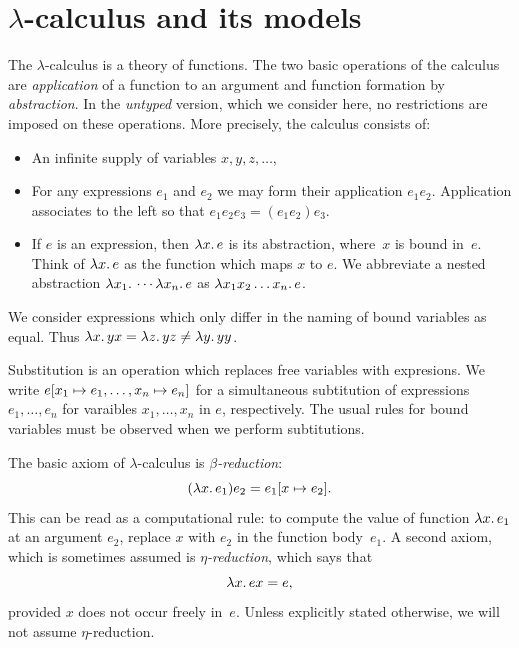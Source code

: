 \section{$\lambda$-calculus and its models}
\label{sec:lambda-calculus}

The $\lambda$-calculus is a theory of functions. The two basic
operations of the calculus are \emph{application} of a function to an
argument and function formation by \emph{abstraction}. In the
\emph{untyped} version, which we consider here, no restrictions are
imposed on these operations. More precisely, the calculus consists of:
%
\begin{itemize}
\item An infinite supply of variables $x, y, z, \ldots$,
\item For any expressions $e_1$ and $e_2$ we may form their
  application $e_1 e_2$. Application associates to the left so that
  $e_1 e_2 e_3 = (e_1 e_2) e_3$.
\item If $e$ is an expression, then $\lambda x .\,e$ is its abstraction,
  where~$x$ is bound in~$e$. Think of $\lambda x .\,e$ as the function
  which maps $x$ to $e$. We abbreviate a nested abstraction
  $\lambda x_1 .\,\cdots \lambda x_n .\,e$ as $\lambda x_1 x_2 \ldots x_n .\,e$.
\end{itemize}
%
We consider expressions which only differ in the naming of bound
variables as equal. Thus $\lambda x .\,y x = \lambda z .\,y z \neq
\lambda y .\,y y$.

Substitution is an operation which replaces free variables with
expresions. We write $e[x_1 \mapsto e_1, \ldots, x_n \mapsto e_n]$ for
a simultaneous subtitution of expressions $e_1, \ldots, e_n$ for
varaibles $x_1, \ldots, x_n$ in $e$, respectively. The usual rules for
bound variables must be observed when we perform subtitutions.

The basic axiom of $\lambda$-calculus is \emph{$\beta$-reduction}:
%
\begin{equation*}
  (\lambda x .\,e_1) e_2 = e_1[x \mapsto e_2].
\end{equation*}
%
This can be read as a computational rule: to compute the value of
function $\lambda x .\,e_1$ at an argument $e_2$, replace $x$ with $e_2$
in the function body~$e_1$. A second axiom, which is sometimes assumed
is \emph{$\eta$-reduction}, which says that
%
\begin{equation*}
  \lambda x .\,e x = e,
\end{equation*}
%
provided $x$ does not occur freely in~$e$. Unless explicitly stated
otherwise, we will not assume $\eta$-reduction.

